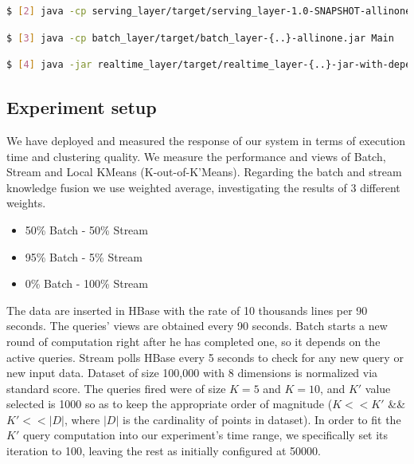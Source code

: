 \documentclass{lmproj}
\begin{document}
\begin{lstlisting}[language=bash]
$ [2] java -cp serving_layer/target/serving_layer-1.0-SNAPSHOT-allinone.jar {option -f with a given queries file}
\end{lstlisting}

\begin{lstlisting}[language=bash]
$ [3] java -cp batch_layer/target/batch_layer-{..}-allinone.jar Main
\end{lstlisting}

\begin{lstlisting}[language=bash]
$ [4] java -jar realtime_layer/target/realtime_layer-{..}-jar-with-dependencies.jar
\end{lstlisting}


\subsection{Experiment setup}

We have deployed and measured the response of our system in terms of execution time and clustering quality. We measure the performance and views of Batch, Stream and Local KMeans (K-out-of-K'Means). Regarding the batch and stream knowledge fusion we use weighted average, investigating the results of 3 different weights.

\begin{itemize}
	\item 50\% Batch - 50\% Stream
	\item 95\% Batch - 5\% Stream
	\item 0\% Batch - 100\% Stream
\end{itemize}

The data are inserted in HBase with the rate of 10 thousands lines per 90 seconds. The queries' views are obtained every 90 seconds. Batch starts a new round of computation right after he has completed one, so it depends on the active queries. Stream polls HBase every 5 seconds to check for any new query or new input data. Dataset of size 100,000 with 8 dimensions is normalized via standard score. The queries fired were of size $K = 5$ and $K = 10$, and $K'$ value selected is 1000 so as to keep the appropriate order of magnitude ($K<<K'$ \&\& $K'<<|D|$, where $|D|$ is the cardinality of points in dataset). In order to fit the $K'$ query computation into our experiment's time range, we specifically set its iteration to 100, leaving the rest as initially configured at 50000.
\end{document}
